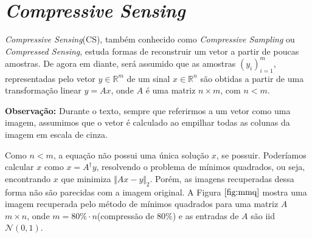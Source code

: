 \chapter{\textit{Compressive Sensing}}

\textit{Compressive Sensing}(CS), também conhecido como \textit{Compressive Sampling} ou \textit{Compressed Sensing},  estuda formas de reconstruir um vetor a partir de poucas amostras. De agora em diante, será assumido que as amostras $(y_i)_{i = 1}^m$, representadas pelo vetor $y \in \mathbb{R}^m$ de um sinal $x \in \mathbb{R}^n$ são obtidas a partir de uma transformação linear $y = Ax$, onde $A$ é uma matriz $n \times m$, com $n < m$.

{\bf Observação:} Durante o texto, sempre que referirmos a um vetor como uma imagem, assumimos que o vetor é calculado ao empilhar todas as colunas da imagem em escala de cinza.

Como $n < m$, a equação não possui uma única solução $x$, se possuir. Poderíamos calcular $x$ como $x = A^{\dagger} y$, resolvendo o problema de mínimos quadrados, ou seja, encontrando $x$ que minimiza $\Vert Ax - y \Vert_2$. Porém, as imagens recuperadas dessa forma não são parecidas com a imagem original. A Figura $\ref{fig:mmq}$ mostra uma imagem recuperada pelo método de mínimos quadrados para uma matriz $A$ $m \times n$, onde $m = 80 \% \cdot n$(compressão de $80\%$) e as entradas de $A$ são iid $\mathcal{N}(0,1)$.

